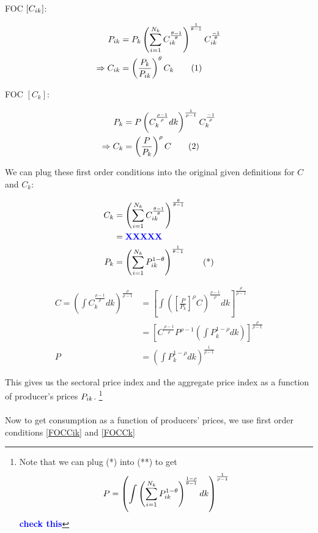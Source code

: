 \documentclass[12pt,oneside,reqno]{amsart}
\newcommand{\fix} [1] {\textbf{\textcolor{blue}{#1}}} %
\newcommand\numberthis{\addtocounter{equation}{1}\tag{\theequation}} %
\begin{document}
\pagebreak
FOC $[C_{ik}]$:

\begin{align*}
P\ik & = P_k \left(\sumi C\ik^{\frac{\theta-1}{\theta}} \right)^{\frac{1}{\theta-1}} C\ik^{\frac{-1}{\theta}}
\\
\Rightarrow
C\ik & = \left( \frac{P_k}{P\ik}\right)^\theta C_k
      \numberthis \label{FOCCik}
\end{align*}


FOC $[C_k]$:

\begin{align*}
P_k & = P \left(C_k^{\frac{\rho-1}{\rho}}dk \right)^{\frac{1}{\rho-1}} C_k^{\frac{-1}{\rho}} 
\\
\Rightarrow
C_k & = \left( \frac{P}{P_k}\right)^\rho C 
    \numberthis \label{FOCCk} 
\end{align*}


We can plug these first order conditions into the original given definitions for $C$ and $C_k$:

\begin{align*}
C_k & = \left( \sum_{i=1}^{N_k} C_{ik}^{\frac{\theta-1}{\theta}}\right)^{\frac{\theta}{\theta-1}}
\\
& = \fix{XXXXX}
\\
P_k & = \left(\sumi P\ik ^{1-\theta}\right)
        ^{\frac{1}{\theta-1}}
        \tag{*} 
\end{align*}


\begin{align*}
C = \left( \int C_k^{\frac{\rho-1}{\rho}}dk\right)^{\frac{\rho}{\rho-1}}
& = \left[ \int \left( \left[ 
    \frac{P}{P_k}\right]^\rho C \right)^{\frac{\rho-1}
    {\rho}} dk \right]^{\frac{\rho}{\rho-1}}
\\
& = \left[C^{\frac{\rho-1}{\rho}} P^{\rho-1} 
    \left( \int P_k^{1-\rho} dk \right)
    \right]^{\frac{\rho}{\rho-1}} 
\\
P & = \left(\int P_k^{1-\rho}dk\right)^{\frac{1}{\rho-1}} 
        \tag{**} 
\end{align*}

This gives us the sectoral price index and the aggregate price index as a function of producer's prices $P_{ik}$.
    \footnote{Note that we can plug (*) into (**) to 
    get 
    \[ P = \left(\int\left(\sum_{i=1}^{N_k} P_{ik} ^{1-\theta}
    \right)^{\frac{1-\rho}{\theta-1}} 
    dk\right)^{\frac{1}{\rho-1}}
    \] 
    \fix{check this}}
\\
\\    
Now to get consumption as a function of producers' prices, we use first order conditions \eqref{FOCCik} and \eqref{FOCCk}
\end{document}
